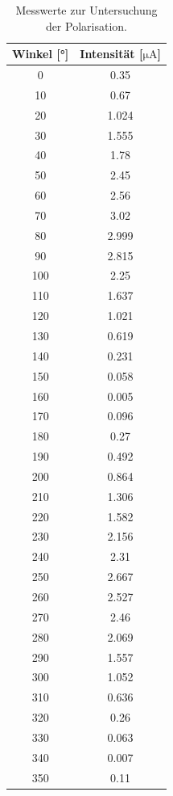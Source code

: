 \begin{table}[H]
  \centering
\begin{tabular}{c|c}
  Winkel [°]  &  Intensität [$ \si{\micro\ampere}$]     \\
  \hline
0   & 0.35  \\
10  & 0.67  \\
20  & 1.024 \\
30  & 1.555 \\
40  & 1.78  \\
50  & 2.45  \\
60  & 2.56  \\
70  & 3.02  \\
80  & 2.999 \\
90  & 2.815 \\
100 & 2.25  \\
110 & 1.637 \\
120 & 1.021 \\
130 & 0.619 \\
140 & 0.231 \\
150 & 0.058 \\
160 & 0.005 \\
170 & 0.096 \\
180 & 0.27  \\
190 & 0.492 \\
200 & 0.864 \\
210 & 1.306 \\
220 & 1.582 \\
230 & 2.156 \\
240 & 2.31  \\
250 & 2.667 \\
260 & 2.527 \\
270 & 2.46  \\
280 & 2.069 \\
290 & 1.557 \\
300 & 1.052 \\
310 & 0.636 \\
320 & 0.26  \\
330 & 0.063 \\
340 & 0.007 \\
350 & 0.11
\end{tabular}
\caption{Messwerte zur Untersuchung der Polarisation.}
\label{polwert}
\end{table}
